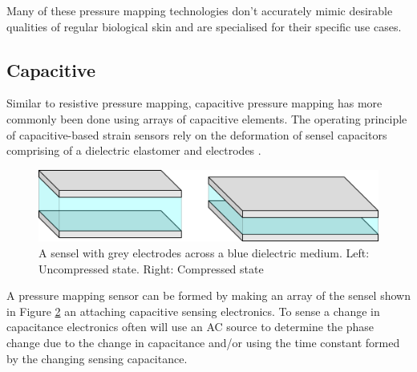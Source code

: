 \begin{figure}[H]
	\label{fig:mechano-tech}
\end{figure}
Many of these pressure mapping technologies don't accurately mimic desirable qualities of regular biological skin and are specialised for their specific use cases.


\subsection{Capacitive}
Similar to resistive pressure mapping, capacitive pressure mapping has more commonly been done using arrays of capacitive elements. The operating principle of capacitive-based strain sensors rely on the deformation of sensel capacitors comprising of a dielectric elastomer and electrodes \cite{Sapra2023,Zhu2021,Liang2015}.
\begin{figure}[H]
	\centering
	\includegraphics[width=0.6\linewidth]{Figures/cap_deformed_states_x2_crop.png}
	\caption{A sensel with grey electrodes across a blue dielectric medium. Left: Uncompressed state. Right: Compressed state}
	\label{fig:cap_deformed_cube}
\end{figure}
A pressure mapping sensor can be formed by making an array of the sensel shown in Figure \ref{fig:cap_deformed_cube} an attaching capacitive sensing electronics. To sense a change in capacitance electronics often will use an AC source to determine the phase change due to the change in capacitance and/or using the time constant formed by the changing sensing capacitance.


